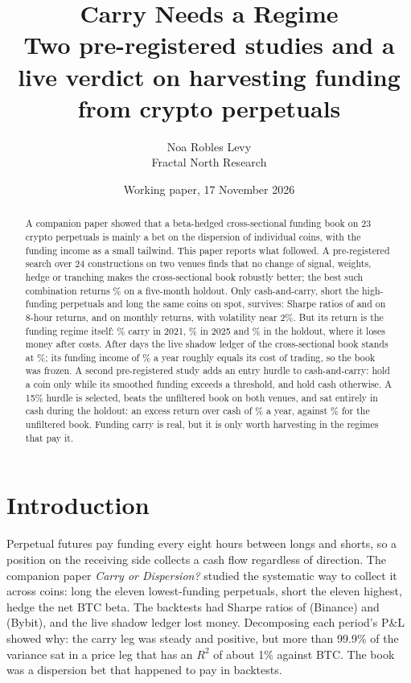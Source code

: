 \documentclass[11pt,a4paper]{article}
\title{\textbf{Carry Needs a Regime}\\[0.3em]
\large Two pre-registered studies and a live verdict on harvesting funding\\
from crypto perpetuals}
\author{Noa Robles Levy\\[0.2em]
\small Fractal North Research}
\date{\small Working paper, 17 November 2026}
\begin{document}
\maketitle

\begin{abstract}
\noindent
A companion paper showed that a beta-hedged cross-sectional funding book on 23 crypto
perpetuals is mainly a bet on the dispersion of individual coins, with the funding
income as a small tailwind. This paper reports what followed. A pre-registered search
over 24 constructions on two venues finds that no change of signal, weights, hedge or
tranching makes the cross-sectional book robustly better; the best such combination
returns \HoldBestXscTotal\% on a five-month holdout. Only cash-and-carry, short the
high-funding perpetuals and long the same coins on spot, survives: Sharpe ratios of
\BnCandSharpe{} and \ByCandSharpe{} on 8-hour returns, \BnCcMonthly{} and \ByCcMonthly{}
on monthly returns, with volatility near 2\%. But its return is the funding regime
itself: \BnCcCarryTwentyOne\% carry in 2021, \ByCcCarryTwentyFive\% in 2025 and \HoCcCarryTwentySix\%
in the holdout, where it loses money after costs. After \LiveDays{} days the live
shadow ledger of the cross-sectional book stands at \LiveTotal\%; its funding income of
\LiveCarryAnn\% a year roughly equals its cost of trading, so the book was frozen. A
second pre-registered study adds an entry hurdle to cash-and-carry: hold a coin only
while its smoothed funding exceeds a threshold, and hold cash otherwise. A 15\% hurdle
is selected, beats the unfiltered book on both venues, and sat entirely in cash during
the holdout: an excess return over cash of \HoTauFifteenExcess\% a year, against
\HoTauZeroExcess\% for the unfiltered book. Funding carry is real, but it is only worth
harvesting in the regimes that pay it.
\end{abstract}

\section{Introduction}

Perpetual futures pay funding every eight hours between longs and shorts, so a position
on the receiving side collects a cash flow regardless of direction. The companion paper
\emph{Carry or Dispersion?} studied the systematic way to collect it across coins: long
the eleven lowest-funding perpetuals, short the eleven highest, hedge the net BTC beta.
The backtests had Sharpe ratios of \BnBaseSharpe{} (Binance) and \ByBaseSharpe{}
(Bybit), and the live shadow ledger lost money. Decomposing each period's P\&L showed
why: the carry leg was steady and positive, but more than 99.9\% of the variance sat
in a price leg that has an $R^2$ of about 1\% against BTC. The book was a dispersion
bet that happened to pay in backtests.
\end{document}
